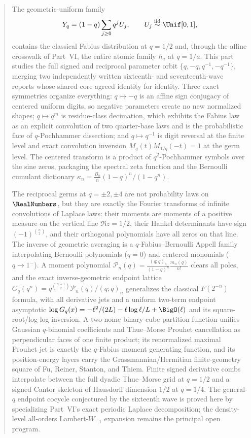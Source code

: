 \documentclass[11pt,oneside]{article}
\numberwithin{equation}{section}
\theoremstyle{definition}
\theoremstyle{remark}
\begin{document}
\begin{abstract}
The geometric-uniform family
\[
 Y_q=(1-q)\sum_{j\ge0}q^jU_j,
 \qquad U_j\stackrel{\mathrm{iid}}{\sim}\Unif[0,1],
\]
contains the classical Fabius distribution at $q=1/2$ and, through the affine
crosswalk of Part~VI, the entire atomic family $h_a$ at $q=1/a$.  This part
studies the full signed and reciprocal parameter orbit
$\{q,-q,q^{-1},-q^{-1}\}$, merging two independently written sixteenth- and
seventeenth-wave reports whose shared core agreed identity for identity.
Three exact symmetries organize everything: $q\mapsto-q$ is an affine sign
conjugacy of centered uniform digits, so negative parameters create no new
normalized shapes; $q\mapsto q^m$ is residue-class decimation, which exhibits
the Fabius law as an explicit convolution of two quarter-base laws and is the
probabilistic face of $q$-Pochhammer dissection; and $q\mapsto q^{-1}$ is digit
reversal at the finite level and exact convolution inversion
$M_q(t)M_{1/q}(-t)=1$ at the germ level.  The centered transform is a product
of $q^2$-Pochhammer symbols over the sine zeros, packaging the spectral zeta
function and the Bernoulli cumulant dictionary
$\kappa_n=\tfrac{B_n}{n}(1-q)^n/(1-q^n)$.

The reciprocal germs at $q=\pm2,\pm4$ are not probability laws on $\RealNumbers$, but
they are exactly the Fourier transforms of infinite convolutions of Laplace
laws: their moments are moments of a positive measure on the vertical line
$\Re z=1/2$, their Hankel determinants have sign $(-1)^{\binom n2}$, and their
orthogonal polynomials have all zeros on that line.  The inverse of geometric
averaging is a $q$-Fabius--Bernoulli Appell family interpolating Bernoulli
polynomials ($q=0$) and centered monomials ($q\to1^-$).  A moment polynomial
$\mathcal P_n(q)=\tfrac{(q;q)_n}{(1-q)^n}\tfrac{m_n(q)}{n!}$ clears all poles,
and the exact inverse-geometric endpoint lattice
$G_q(q^n)=q^{\binom{n+1}2}\mathcal P_n(q)/(q;q)_n$ generalizes the classical
$F(2^{-n})$ formula, with all derivative jets and a uniform two-term
endpoint asymptotic
$\log G_q(x)=-\ell^2/(2L)-\ell\log\ell/L+\BigO(\ell)$ and its square-root/log-log
inversion.  A two-nome binary-cube partition function unifies Gaussian
$q$-binomial coefficients and Thue--Morse Prouhet cancellation as perpendicular
faces of one finite product; its renormalized maximal Prouhet jet is exactly
the $q$-Fabius moment generating function, and its position-energy layers
carry the Grassmannian/Hermitian finite-geometry square of Fu, Reiner,
Stanton, and Thiem.  Finite signed derivative combs interpolate between the
full dyadic Thue--Morse grid at $q=1/2$ and a signed Cantor skeleton of
Hausdorff dimension $1/2$ at $q=1/4$.  The general-$q$ endpoint cocycle
conjectured by the sixteenth wave is proved here by specializing Part~VI's
exact periodic Laplace decomposition; the density-level all-orders
Lambert-$W_{-1}$ expansion remains the principal open program.
\end{abstract}
\end{document}

